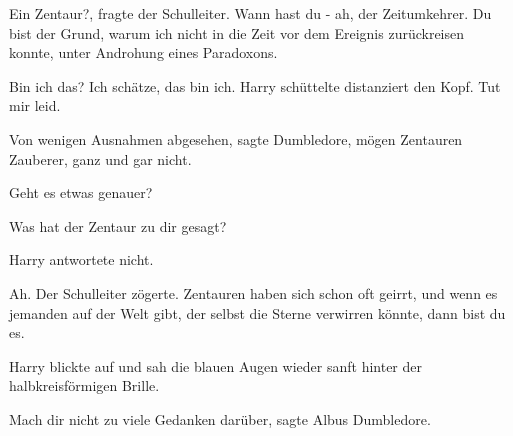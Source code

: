 \glqq{}Ein Zentaur?\grqq{}, fragte der Schulleiter. \glqq{}Wann hast du - ah, der
Zeitumkehrer. Du bist der Grund, warum ich nicht in die Zeit vor dem Ereignis
zurückreisen konnte, unter Androhung eines Paradoxons.\grqq{}

\glqq{}Bin ich das? Ich schätze, das bin ich.\grqq{} Harry schüttelte distanziert
den Kopf. \glqq{}Tut mir leid.\grqq{}

\glqq{}Von wenigen Ausnahmen abgesehen\grqq{}, sagte Dumbledore, \glqq{}mögen
Zentauren Zauberer, ganz und gar nicht.\grqq{}

\glqq{}Geht es etwas genauer?\grqq{}

\glqq{}Was hat der Zentaur zu dir gesagt?\grqq{}

Harry antwortete nicht.

\glqq{}Ah.\grqq{} Der Schulleiter zögerte. \glqq{}Zentauren haben sich schon oft
geirrt, und wenn es jemanden auf der Welt gibt, der selbst die Sterne verwirren
könnte, dann bist du es.\grqq{}

Harry blickte auf und sah die blauen Augen wieder sanft hinter der
halbkreisförmigen Brille.

\glqq{}Mach dir nicht zu viele Gedanken darüber\grqq{}, sagte Albus Dumbledore.

